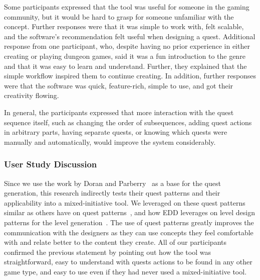 Some participants expressed that the tool was useful for someone in the gaming community, but it would be hard to grasp for someone unfamiliar with the concept. Further responses were that it was simple to work with, felt scalable, and the software's recommendation felt useful when designing a quest. Additional response from one participant, who, despite having no prior experience in either creating or playing dungeon games, said it was a fun introduction to the genre and that it was easy to learn and understand. Further, they explained that the simple workflow inspired them to continue creating. In addition, further responses were that the software was quick, feature-rich, simple to use, and got their creativity flowing.

In general, the participants expressed that more interaction with the quest sequence itself, such as changing the order of subsequences, adding quest actions in arbitrary parts, having separate quests, or knowing which quests were manually and automatically, would improve the system considerably. 

\subsubsection{User Study Discussion}

Since we use the work by Doran and Parberry~ as a base for the quest generation, this research indirectly tests their quest patterns and their applicability into a mixed-initiative tool. We leveraged on these quest patterns similar as others have on quest patterns~, and how EDD leverages on level design patterns for the level generation~. The use of quest patterns greatly improves the communication with the designers as they can use concepts they feel comfortable with and relate better to the content they create. All of our participants confirmed the previous statement by pointing out how the tool was straightforward, easy to understand with quests actions to be found in any other game type, and easy to use even if they had never used a mixed-initiative tool.


